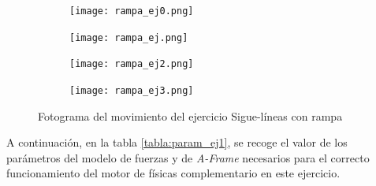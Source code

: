 \begin{figure}[h!]
\begin{subfigure}[b]{0.5\textwidth}
    \texttt{[image: rampa\_ej0.png]}
  \end{subfigure}
  \hfill
  \hfill
  \begin{subfigure}[b]{0.5\textwidth}
    \texttt{[image: rampa\_ej.png]}
  \end{subfigure}
    \hfill
    \hfill
  \begin{subfigure}[b]{0.5\textwidth}
    \texttt{[image: rampa\_ej2.png]}
  \end{subfigure}
    \hfill
  \begin{subfigure}[b]{0.5\textwidth}
    \texttt{[image: rampa\_ej3.png]}
  \end{subfigure}
    \caption{Fotograma del movimiento del ejercicio Sigue-líneas con rampa}
    \label{fig:Sigue-líneas con rampa}
\end{figure}

\clearpage

A continuación, en la tabla \ref{tabla:param_ej1}, se recoge el valor de los parámetros del modelo de fuerzas y de  \textit{A-Frame} necesarios para el correcto funcionamiento del motor de físicas complementario en este ejercicio.


